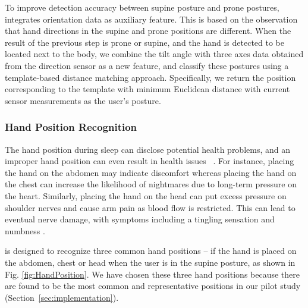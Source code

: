 To improve detection accuracy between supine posture and prone postures, \systemname integrates orientation data as auxiliary feature. This is based on the observation that hand directions in the supine and prone positions are different. When the result of the previous step is prone or supine, and the hand is detected to be located next to the body, we combine the tilt angle with three axes data obtained from the direction sensor as a new feature, and classify these postures using a template-based distance matching approach. Specifically, we return the position corresponding to the template with minimum Euclidean distance with current sensor measurements as the user's posture. %


\subsubsection{Hand Position Recognition\label{sec:handpr}}

The hand position during sleep can disclose potential health problems, and an improper hand position can even result in health issues~
\cite{position2014}. For instance, placing the hand on the abdomen may indicate discomfort whereas placing the hand on the chest can
increase the likelihood of nightmares due to long-term pressure on the heart. Similarly, placing the hand on the head can put excess
pressure on shoulder nerves and cause arm pain as blood flow is restricted. This can lead to eventual nerve damage, with symptoms including
a tingling sensation and numbness \cite{position2014}.


{\systemname} is designed to recognize three common hand positions -- if the hand is placed on the abdomen, chest or head when the user is
in the supine posture, as shown in Fig. \ref{fig:HandPosition}. We have chosen these three hand positions because there are found to be the
most common and representative positions in our pilot study (Section~\ref{sec:implementation}).




